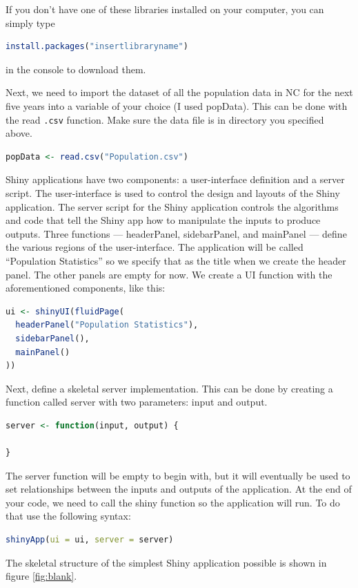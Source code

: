 \noindent If you don't have one of these libraries installed on your computer, you can simply type 
\begin{lstlisting}[language = R]
install.packages("insertlibraryname") 
\end{lstlisting}
in the console to download them. 

\noindent Next, we need to import the dataset of all the population data in NC for the next five years into a variable of your choice (I used popData).
This can be done with the read \texttt{.csv} function.
Make sure the data file is in directory you specified above. 

\begin{lstlisting}[language = R]
popData <- read.csv("Population.csv")
\end{lstlisting}
Shiny applications have two components: a user-interface definition and a server script.
The user-interface is used to control the design and layouts of the Shiny application.
The server script for the Shiny application controls the algorithms and code that tell the Shiny app how to manipulate the inputs to produce outputs.\cite{shiny} 
Three functions --- headerPanel, sidebarPanel, and mainPanel --- define the various regions of the user-interface.
The application will be called “Population Statistics” so we specify that as the title when we create the header panel.
The other panels are empty for now.
We create a UI function with the aforementioned components, like this:
\begin{lstlisting}[language = R]
ui <- shinyUI(fluidPage(
  headerPanel("Population Statistics"),
  sidebarPanel(),
  mainPanel()
))
\end{lstlisting}
Next, define a skeletal server implementation. This can be done by creating a function called server with two parameters: input and output.
\begin{lstlisting}[language = R]
server <- function(input, output) {

}
\end{lstlisting}
The server function will be empty to begin with, but it will eventually be used to set relationships between the inputs and outputs of the application. At the end of your code, we need to call the shiny function so the application will run. To do that use the following syntax: 
\begin{lstlisting}[language = R]
shinyApp(ui = ui, server = server)
\end{lstlisting}
The skeletal structure of the simplest Shiny application possible is shown in figure \ref{fig:blank}. 
